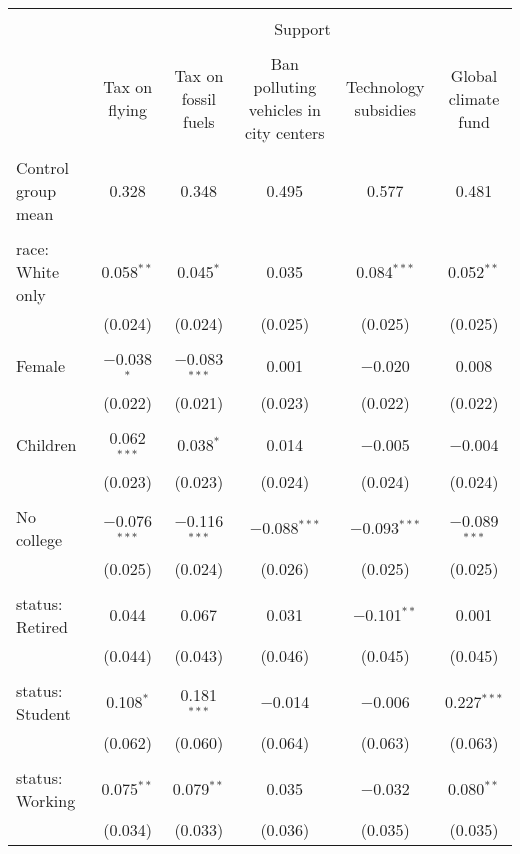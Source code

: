 
\begin{tabular}{@{\extracolsep{5pt}}lccccc} 
\\[-1.8ex]\hline 
\hline \\[-1.8ex] 
 & \multicolumn{5}{c}{Support} \\ 
\cline{2-6} 
\\[-1.8ex] & Tax on flying & Tax on fossil fuels & Ban polluting vehicles in city centers & Technology subsidies & Global climate fund \\ 
\hline \\[-1.8ex] 
 Control group mean & 0.328 & 0.348 & 0.495 & 0.577 & 0.481  \\ \hline \\[-1.8ex] race: White only & 0.058$^{**}$ & 0.045$^{*}$ & 0.035 & 0.084$^{***}$ & 0.052$^{**}$ \\ 
  & (0.024) & (0.024) & (0.025) & (0.025) & (0.025) \\ 
  & & & & & \\ 
 Female & $-$0.038$^{*}$ & $-$0.083$^{***}$ & 0.001 & $-$0.020 & 0.008 \\ 
  & (0.022) & (0.021) & (0.023) & (0.022) & (0.022) \\ 
  & & & & & \\ 
 Children & 0.062$^{***}$ & 0.038$^{*}$ & 0.014 & $-$0.005 & $-$0.004 \\ 
  & (0.023) & (0.023) & (0.024) & (0.024) & (0.024) \\ 
  & & & & & \\ 
 No college & $-$0.076$^{***}$ & $-$0.116$^{***}$ & $-$0.088$^{***}$ & $-$0.093$^{***}$ & $-$0.089$^{***}$ \\ 
  & (0.025) & (0.024) & (0.026) & (0.025) & (0.025) \\ 
  & & & & & \\ 
 status: Retired & 0.044 & 0.067 & 0.031 & $-$0.101$^{**}$ & 0.001 \\ 
  & (0.044) & (0.043) & (0.046) & (0.045) & (0.045) \\ 
  & & & & & \\ 
 status: Student & 0.108$^{*}$ & 0.181$^{***}$ & $-$0.014 & $-$0.006 & 0.227$^{***}$ \\ 
  & (0.062) & (0.060) & (0.064) & (0.063) & (0.063) \\ 
  & & & & & \\ 
 status: Working & 0.075$^{**}$ & 0.079$^{**}$ & 0.035 & $-$0.032 & 0.080$^{**}$ \\ 
  & (0.034) & (0.033) & (0.036) & (0.035) & (0.035) \\ 

\end{tabular}
